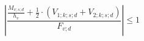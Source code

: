 \documentclass[12pt]{article}
\begin{document}
\begin{displaymath}
\left| \frac {\frac {M_{v;s;d}} {h_v} + \frac {1} {2} \cdot \left( V_{1;k;s;d} + V_{2;k;s;d} \right)} {F_{v;d}} \right| \leq 1
\end{displaymath}
\end{document}
